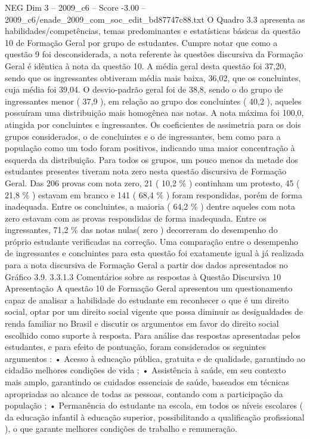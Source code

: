 \begin{textsample}{NEG Dim 3 – 2009\_c6 – Score -3.00 – 2009\_c6/enade\_2009\_com\_soc\_edit\_bd87747c88.txt}
O Quadro 3.3 apresenta as habilidades/competências, temas predominantes e estatísticas básicas da questão 10 de Formação Geral por grupo de estudantes.
Cumpre notar que como a questão 9 foi desconsiderada, a nota referente às questões discursiva da Formação Geral é idêntica à nota da questão 10.
A média geral desta questão foi 37,20, sendo que os ingressantes obtiveram média mais baixa, 36,02, que os concluintes, cuja média foi 39,04.
O desvio-padrão geral foi de 38,8, sendo o do grupo de ingressantes menor ( 37,9 ), em relação ao grupo dos concluintes ( 40,2 ), aqueles possuíram uma distribuição mais homogênea nas notas.
A nota máxima foi 100,0, atingida por concluintes e ingressantes.
Os coeficientes de assimetria para os dois grupos considerados, o de concluintes e o de ingressantes, bem como para a população como um todo foram positivos, indicando uma maior concentração à esquerda da distribuição.
Para todos os grupos, um pouco menos da metade dos estudantes presentes tiveram nota zero nesta questão discursiva de Formação Geral.
Das 206 provas com nota zero, 21 ( 10,2 \% ) continham um protesto, 45 ( 21,8 \% ) estavam em branco e 141 ( 68,4 \% ) foram respondidas, porém de forma inadequada.
Entre os concluintes, a maioria ( 64,2 \% ) dentre aqueles com nota zero estavam com as provas respondidas de forma inadequada.
Entre os ingressantes, 71,2 \% das notas nulas( zero ) decorreram do desempenho do próprio estudante verificadas na correção.
Uma comparação entre o desempenho de ingressantes e concluintes para esta questão foi exatamente igual à já realizada para a nota discursiva de Formação Geral a partir dos dados apresentados no Gráfico 3.9. 3.3.1.3 Comentários sobre as respostas à Questão Discursiva 10 Apresentação A questão 10 de Formação Geral apresentou um questionamento capaz de analisar a habilidade do estudante em reconhecer o que é um direito social, optar por um direito social vigente que possa diminuir as desigualdades de renda familiar no Brasil e discutir os argumentos em favor do direito social escolhido como suporte à resposta.
Para análise das respostas apresentadas pelos estudantes, e para efeito de pontuação, foram considerados os seguintes argumentos : • Acesso à educação pública, gratuita e de qualidade, garantindo ao cidadão melhores condições de vida ; • Assistência à saúde, em seu contexto mais amplo, garantindo os cuidados essenciais de saúde, baseados em técnicas apropriadas ao alcance de todas as pessoas, contando com a participação da população ; • Permanência do estudante na escola, em todos os níveis escolares ( da educação infantil à educação superior, possibilitando a qualificação profissional ), o que garante melhores condições de trabalho e remuneração.

\end{textsample}
